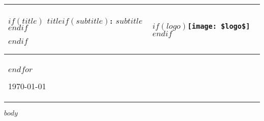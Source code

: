 \documentclass[11pt,letterpaper,american]{extarticle}
\providecommand{\tabularnewline}{\\}
\begin{document}
\begin{minipage}[t]{1\columnwidth}%
\begin{center}
\begin{tabular}[t]{>{\raggedright}p{4in}>{\centering}p{2.25in}}
\hline 
\medskip{}
$if(title)$
\textsc{\Large{}$title$$if(subtitle)$: $subtitle$$endif$}{\Large \par}
$endif$

\medskip{}  & \medskip{} $if(logo)$\texttt{[image: \$logo\$]}$endif$\tabularnewline
\hline

\multicolumn{2}{>{\raggedright}p{6in}}{\medskip{}
$for(author)$$author.name$$if(author.description)$,
              $author.description$$endif$$if(author.affiliation)$,
              $author.affiliation$$endif$$if(author.email)$ <$author.email$>$endif$\\
$endfor$


\begin{singlespace}
\raggedright{}{\today}
\end{singlespace}
}\tabularnewline
\hline 
\end{tabular}
\par\end{center}
\medskip{}

\end{minipage}

$body$
\end{document}
